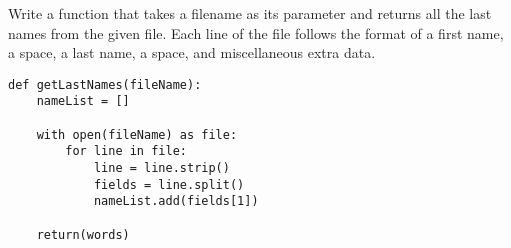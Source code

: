 Write a function that takes a filename as its parameter and returns all the last names from the given file. Each line of the file follows the format of a first name, a space, a last name, a space, and miscellaneous extra data. 

\begin{answer}
\begin{lstlisting}
def getLastNames(fileName):
    nameList = []

    with open(fileName) as file:
        for line in file:
            line = line.strip()
            fields = line.split()
            nameList.add(fields[1])

    return(words)
\end{lstlisting}
\end{answer}